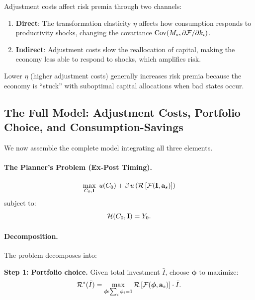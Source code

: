 \begin{calloutnote}
Adjustment costs affect risk premia through two channels:
\begin{enumerate}[nosep]
\item \textbf{Direct}: The transformation elasticity $\eta$ affects how consumption responds to productivity shocks, changing the covariance $\text{Cov}(M_s, \partial \mathcal{F} / \partial k_i)$.
\item \textbf{Indirect}: Adjustment costs slow the reallocation of capital, making the economy less able to respond to shocks, which amplifies risk.
\end{enumerate}

Lower $\eta$ (higher adjustment costs) generally increases risk premia because the economy is ``stuck'' with suboptimal capital allocations when bad states occur.
\end{calloutnote}

\subsection{The Full Model: Adjustment Costs, Portfolio Choice, and Consumption-Savings}
\label{subsec:ac-risk-full}

We now assemble the complete model integrating all three elements.

\paragraph{The Planner's Problem (Ex-Post Timing).}
\begin{equation}
\max_{C_0, \mathbf{I}} \; u(C_0) + \beta \, u\left( \mathcal{R}\left[ \mathcal{F}(\mathbf{I}, \mathbf{a}_s) \right] \right)
\label{eq:ac-risk-full-obj}
\end{equation}
subject to:
\begin{equation}
\mathcal{H}(C_0, \mathbf{I}) = Y_0.
\label{eq:ac-risk-full-const}
\end{equation}

\paragraph{Decomposition.}
The problem decomposes into:

\medskip
\noindent
\textbf{Step 1: Portfolio choice.} Given total investment $\bar{I}$, choose $\boldsymbol{\phi}$ to maximize:
\begin{equation}
\mathcal{R}^*(\bar{I}) = \max_{\boldsymbol{\phi}: \sum_i \phi_i = 1} \mathcal{R}\left[ \mathcal{F}(\boldsymbol{\phi}, \mathbf{a}_s) \right] \cdot \bar{I}.
\label{eq:ac-risk-step1}
\end{equation}

